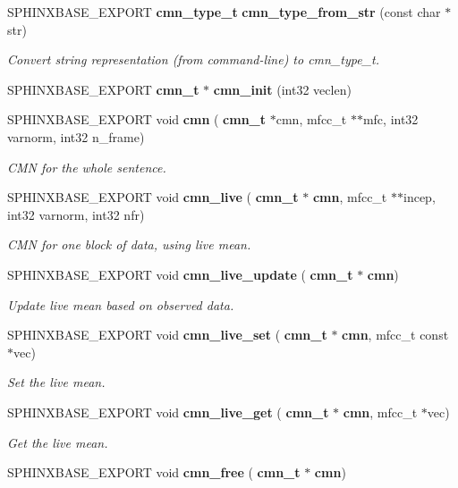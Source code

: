 \begin{DoxyCompactItemize}
\item 
\mbox{\label{cmn_8h_acf5e65a03a0d74630add4a400fed0ce8}} 
S\+P\+H\+I\+N\+X\+B\+A\+S\+E\+\_\+\+E\+X\+P\+O\+RT \textbf{ cmn\+\_\+type\+\_\+t} \textbf{ cmn\+\_\+type\+\_\+from\+\_\+str} (const char $\ast$str)
\begin{DoxyCompactList}\small\item\em Convert string representation (from command-\/line) to cmn\+\_\+type\+\_\+t. \end{DoxyCompactList}\item 
\mbox{\label{cmn_8h_a7ba6ce5489afce232b9bb61bd2ebd20f}} 
S\+P\+H\+I\+N\+X\+B\+A\+S\+E\+\_\+\+E\+X\+P\+O\+RT \textbf{ cmn\+\_\+t} $\ast$ {\bfseries cmn\+\_\+init} (int32 veclen)
\item 
S\+P\+H\+I\+N\+X\+B\+A\+S\+E\+\_\+\+E\+X\+P\+O\+RT void \textbf{ cmn} (\textbf{ cmn\+\_\+t} $\ast$cmn, mfcc\+\_\+t $\ast$$\ast$mfc, int32 varnorm, int32 n\+\_\+frame)
\begin{DoxyCompactList}\small\item\em C\+MN for the whole sentence. \end{DoxyCompactList}\item 
S\+P\+H\+I\+N\+X\+B\+A\+S\+E\+\_\+\+E\+X\+P\+O\+RT void \textbf{ cmn\+\_\+live} (\textbf{ cmn\+\_\+t} $\ast$\textbf{ cmn}, mfcc\+\_\+t $\ast$$\ast$incep, int32 varnorm, int32 nfr)
\begin{DoxyCompactList}\small\item\em C\+MN for one block of data, using live mean. \end{DoxyCompactList}\item 
\mbox{\label{cmn_8h_ad63cc93b21560d4d33f866768775efd5}} 
S\+P\+H\+I\+N\+X\+B\+A\+S\+E\+\_\+\+E\+X\+P\+O\+RT void \textbf{ cmn\+\_\+live\+\_\+update} (\textbf{ cmn\+\_\+t} $\ast$\textbf{ cmn})
\begin{DoxyCompactList}\small\item\em Update live mean based on observed data. \end{DoxyCompactList}\item 
\mbox{\label{cmn_8h_ae2d0e4bdd885b433c93d5dacca09bb86}} 
S\+P\+H\+I\+N\+X\+B\+A\+S\+E\+\_\+\+E\+X\+P\+O\+RT void \textbf{ cmn\+\_\+live\+\_\+set} (\textbf{ cmn\+\_\+t} $\ast$\textbf{ cmn}, mfcc\+\_\+t const $\ast$vec)
\begin{DoxyCompactList}\small\item\em Set the live mean. \end{DoxyCompactList}\item 
\mbox{\label{cmn_8h_a3621707e373ae24bcd47b6aa691cbb3a}} 
S\+P\+H\+I\+N\+X\+B\+A\+S\+E\+\_\+\+E\+X\+P\+O\+RT void \textbf{ cmn\+\_\+live\+\_\+get} (\textbf{ cmn\+\_\+t} $\ast$\textbf{ cmn}, mfcc\+\_\+t $\ast$vec)
\begin{DoxyCompactList}\small\item\em Get the live mean. \end{DoxyCompactList}\item 
\mbox{\label{cmn_8h_a0f70f378107e3d4e861e39d4f76d8d50}} 
S\+P\+H\+I\+N\+X\+B\+A\+S\+E\+\_\+\+E\+X\+P\+O\+RT void {\bfseries cmn\+\_\+free} (\textbf{ cmn\+\_\+t} $\ast$\textbf{ cmn})
\end{DoxyCompactItemize}
